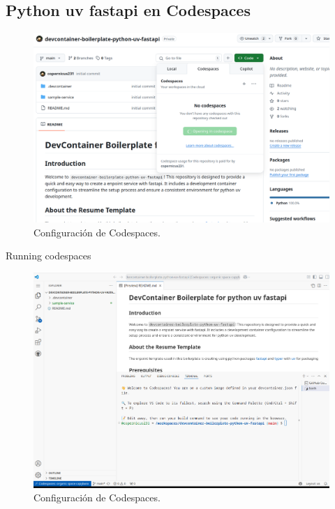 \documentclass{beamer}
\begin{document}
\subsection{Python uv fastapi en Codespaces}
\begin{frame}{\subsecname}
      \begin{figure}
        \centering
        \includegraphics[width=\textwidth]{images/open-codespaces.png}
        \caption{Configuración de Codespaces.}
      \end{figure}
\end{frame}
\begin{frame}{Running codespaces}
  \begin{figure}
    \centering
    \includegraphics[width=\textwidth]{images/codespaces-up.png}
    \caption{Configuración de Codespaces.}
  \end{figure}
\end{frame}
\end{document}
